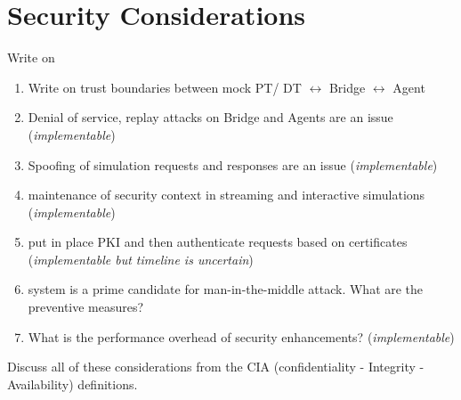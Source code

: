 
\section{Security Considerations}
\label{sec:security}

Write on
\begin{enumerate}
    \item Write on trust boundaries between mock PT/ DT $\longleftrightarrow$ Bridge $\longleftrightarrow$ Agent   \item Denial of service, replay attacks on Bridge and Agents are an issue (\textit{implementable})
    \item Spoofing of simulation requests and responses are an issue (\textit{implementable})
    \item maintenance of security context in streaming and interactive simulations (\textit{implementable})
    \item put in place PKI and then authenticate requests based on certificates (\textit{implementable but timeline is uncertain})
    \item system is a prime candidate for man-in-the-middle attack. What are the preventive measures?
    \item What is the performance overhead of security enhancements? (\textit{implementable})
\end{enumerate}

Discuss all of these considerations from the CIA (confidentiality - Integrity - Availability) definitions.